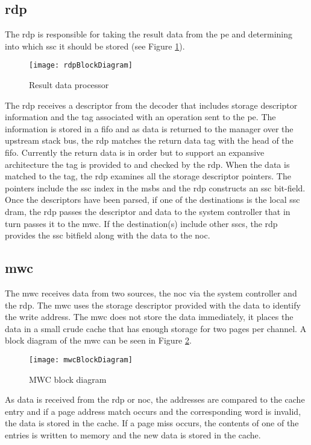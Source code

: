 \subsection{\Acf{rdp}}
\label{sec:RDP}
The \ac{rdp} is responsible for taking the result data from the \ac{pe} and determining into which \ac{ssc} it should be stored (see Figure \ref{fig:RDP block diagram}).

\begin{figure}[h]
\centering
\captionsetup{justification=centering}
\captionsetup{width=.9\linewidth}
\centerline{
\mbox{\texttt{[image: rdpBlockDiagram]}}
}
\center\caption{Result data processor}
\label{fig:RDP block diagram}
\end{figure}

The \ac{rdp} receives a descriptor from the decoder that includes storage descriptor information and the tag associated with an operation sent to the \ac{pe}.
The information is stored in a \ac{fifo} and as data is returned to the manager over the upstream stack bus, the \ac{rdp} matches the return data tag with the head of the \ac{fifo}.
Currently the return data is in order but to support an expansive architecture the tag is provided to and checked by the \ac{rdp}.
When the data is matched to the tag, the \ac{rdp} examines all the storage descriptor pointers. The pointers include the \ac{ssc} index in the \acp{msb} and the \ac{rdp} constructs an \ac{ssc} bit-field.
Once the descriptors have been parsed, if one of the destinations is the local \ac{ssc} \ac{dram}, the \ac{rdp} passes the descriptor and data to the system controller that in turn passes it to the \ac{mwc}.
If the destination(s) include other \acp{ssc}, the \ac{rdp} provides the \ac{ssc} bitfield along with the data to the \ac{noc}.


\subsection{\Acf{mwc}}
\label{sec:MWC}

The \acf{mwc} receives data from two sources, the \ac{noc} via the system controller and the \ac{rdp}.
The \ac{mwc} uses the storage descriptor provided with the data to identify the write address.
The \ac{mwc} does not store the data immediately, it places the data in a small crude cache that has enough storage for two pages per channel.
A block diagram of the \ac{mwc} can be seen in Figure \ref{fig:MWC block diagram}.
\begin{figure}[h]
\centering
\captionsetup{justification=centering}
\captionsetup{width=.9\linewidth}
\centerline{
\mbox{\texttt{[image: mwcBlockDiagram]}}
}
\center\caption{MWC block diagram}
\label{fig:MWC block diagram}
\end{figure}
As data is received from the \ac{rdp} or \ac{noc}, the addresses are compared to the cache entry and if a page address match occurs and the corresponding word is invalid, the data is stored in the cache.
If a page miss occurs, the contents of one of the entries is written to memory and the new data is stored in the cache.

